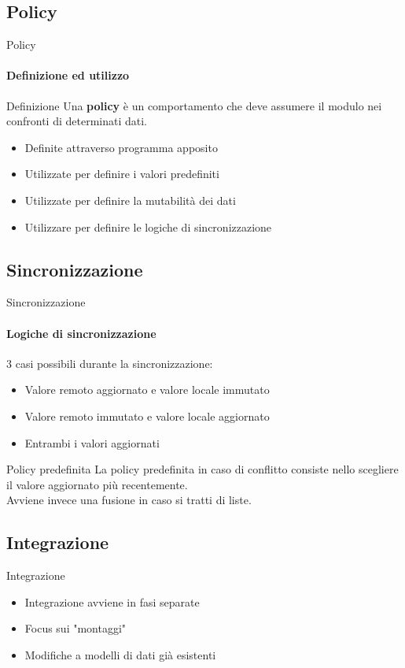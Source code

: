 \documentclass{beamer}
\begin{document}
\begin{darkframes}
    \subsection{Policy}
    \begin{frame}{Policy}
      \framesubtitle{Definizione ed utilizzo}
      \begin{block}{Definizione}
        Una \textbf{policy} è un comportamento che deve assumere il modulo nei confronti di determinati dati.
      \end{block}
      \begin{itemize}
        \item Definite attraverso programma apposito
        \item Utilizzate per definire i valori predefiniti
        \item Utilizzate per definire la mutabilità dei dati
        \item Utilizzare per definire le logiche di sincronizzazione
      \end{itemize}

    \end{frame}

    \subsection{Sincronizzazione}
    \begin{frame}{Sincronizzazione}
      \framesubtitle{Logiche di sincronizzazione}
      3 casi possibili durante la sincronizzazione:
      \begin{itemize}
        \item Valore remoto aggiornato e valore locale immutato
        \item Valore remoto immutato e valore locale aggiornato
        \item Entrambi i valori aggiornati
      \end{itemize}

      \begin{block}{Policy predefinita}
        La policy predefinita in caso di conflitto consiste nello scegliere il valore aggiornato più recentemente.\\
        Avviene invece una fusione in caso si tratti di liste.
      \end{block}

    \end{frame}

    \subsection{Integrazione}
    \begin{frame}{Integrazione}
      \begin{itemize}
        \item Integrazione avviene in fasi separate
        \item Focus sui "montaggi"
        \item Modifiche a modelli di dati già esistenti
      \end{itemize}
    \end{frame}


\end{darkframes}
\end{document}
